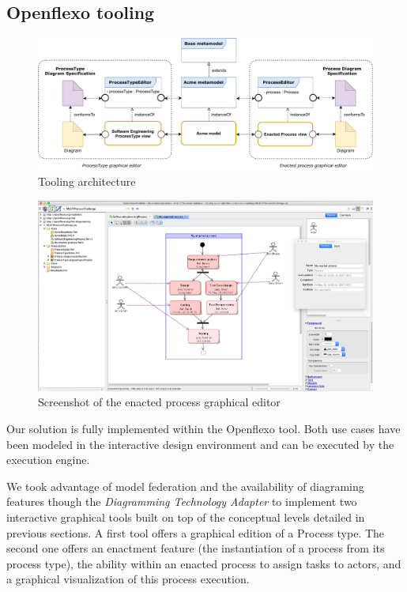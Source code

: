 \subsection{Openflexo tooling}
\label{subsec:tooling}

\begin{figure}
 \centering
     \includegraphics[width=0.9 \textwidth]{Figures/ToolingArchitecture.pdf}
     \caption{Tooling architecture}
    \label{fig:ToolingArchitecture}
\end{figure}

\begin{figure}
 \centering
     \includegraphics[width=\textwidth]{Figures/ScreenshotEnactedProcessEditor.png}
     \caption{Screenshot of the enacted process graphical editor}
    \label{fig:ScreenshotEnactedProcessEditor}
\end{figure}

Our solution is fully implemented within the Openflexo tool. Both use cases have been modeled in the interactive design environment and can be executed by the \FML execution engine.


We took advantage of model federation and the availability of diagraming features though the \textit{Diagramming Technology Adapter} to implement two interactive graphical tools built on top of the conceptual levels detailed in previous sections. A first tool offers a graphical edition of a Process type. The second one offers an enactment feature (the instantiation of a process from its process type), the ability within an enacted process to assign tasks to actors, and a graphical visualization of this process execution.


